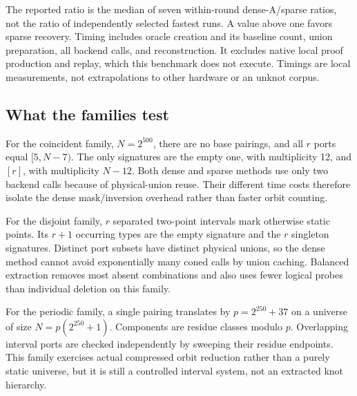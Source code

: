\documentclass[11pt]{article}
\theoremstyle{definition}
\begin{document}
The reported ratio is the median of seven within-round dense-A/sparse
ratios, not the ratio of independently selected fastest runs. A value above
one favors sparse recovery. Timing includes oracle creation and its baseline
count, union preparation, all backend calls, and reconstruction. It excludes
native local proof production and replay, which this benchmark does not
execute. Timings are local measurements, not extrapolations to other
hardware or an unknot corpus.

\begin{table}[t]
\centering\small

\caption{Controlled component timings. Dense A and B are identical controls.
The last column is the paired dense-A/split ratio; values below one are
regressions. No native proof-generation or whole-knot time is included.}
\label{tab:timings}
\end{table}

\begin{table}[t]
\centering\small

\caption{Backend calls and logical discovery requests on the same workloads.
The dense reference evaluates all subset masks, but equal physical unions
share backend work. Split requests can exceed distinct backend calls.}
\label{tab:queries}
\end{table}

\subsection{What the families test}
For the coincident family, $N=2^{500}$, there are no base pairings, and all
$r$ ports equal $[5,N-7)$. The only signatures are the empty one, with
multiplicity 12, and $[r]$, with multiplicity $N-12$. Both dense and sparse
methods use only two backend calls because of physical-union reuse. Their
different time costs therefore isolate the dense mask/inversion overhead
rather than faster orbit counting.

For the disjoint family, $r$ separated two-point intervals mark otherwise
static points. Its $r+1$ occurring types are the empty signature and the
$r$ singleton signatures. Distinct port subsets have distinct physical
unions, so the dense method cannot avoid exponentially many coned calls by
union caching. Balanced extraction removes most absent combinations and
also uses fewer logical probes than individual deletion on this family.

For the periodic family, a single pairing translates by
$p=2^{250}+37$ on a universe of size $N=p(2^{250}+1)$. Components are residue
classes modulo $p$. Overlapping interval ports are checked independently
by sweeping their residue endpoints. This family exercises actual compressed
orbit reduction rather than a purely static universe, but it is still a
controlled interval system, not an extracted knot hierarchy.
\end{document}
